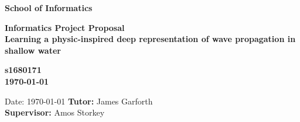 \documentclass[a4paper,11pt]{article}
\newcommand{\examnumber}{s1680171}
\newcommand{\field}{Learning a physic-inspired deep representation of wave propagation in shallow water}
\newcommand{\tutor}{James Garforth}
\newcommand{\supervisor}{Amos Storkey}
\begin{document}
\begin{minipage}[b]{110mm}
        {\Huge\bf School of Informatics
        \vspace*{17mm}}
\end{minipage}
\hfill
\begin{minipage}[t]{40mm}               
\end{minipage}
\par\noindent
\vspace*{2cm}
\begin{center}
        \Large\bf Informatics Project Proposal \\
        \Large\bf \field
\end{center}
\vspace*{1.5cm}
\begin{center}
        \bf \examnumber\\
        \monthyeardate\today
\end{center}
\vspace*{5mm}

%
%                       
\begin{abstract}
  Wave propagation is an important problem from both a theoretical and practical point of view because it is key to many fields of science and engineering. The current numerical solvers are slow and cannot be used in iterative design work-flows. In recent years various deep learning methods have been used to produce fast approximations. This work compares generic architectures and methods specialized on fluid flow on grounds of accuracy, speed and ability to predict other physical systems hoping to provide a systematic assessment that is lacking as of now. Furthermore, we propose a new architecture that stands between generic and specialized methods, inspired by a Hamiltonian formulation for conservative systems. Learning efficiently such a representation will allow faster solutions and also provide us with insights on how learning algorithms encapsulate physical dynamics in a wide range of physical systems. 
\end{abstract}

\vspace*{1cm}
\vspace*{3cm}
Date: \today
\vfill
{\bf Tutor:} \tutor\\
{\bf Supervisor:} \supervisor
\newpage

\setcounter{page}{1}                            %
\footruleheight{1pt}
\headruleheight{1pt}
\rhead{- \thepage}
\cfoot{}
%
\tableofcontents                                %
\end{document}
